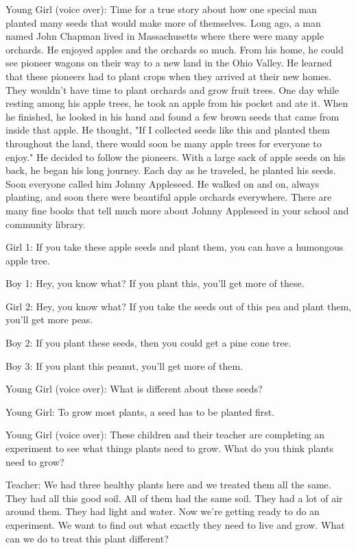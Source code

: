Young Girl (voice over): Time for a true story about how one special man planted many seeds that would make more of themselves. Long ago, a man named John Chapman lived in Massachusetts where there were many apple orchards. He enjoyed apples and the orchards so much. From his home, he could see pioneer wagons on their way to a new land in the Ohio Valley. He learned that these pioneers had to plant crops when they arrived at their new homes. They wouldn't have time to plant orchards and grow fruit trees. One day while resting among his apple trees, he took an apple from his pocket and ate it. When he finished, he looked in his hand and found a few brown seeds that came from inside that apple. He thought, "If I collected seeds like this and planted them throughout the land, there would soon be many apple trees for everyone to enjoy." He decided to follow the pioneers. With a large sack of apple seeds on his back, he began his long journey. Each day as he traveled, he planted his seeds. Soon everyone called him Johnny Appleseed. He walked on and on, always planting, and soon there were beautiful apple orchards everywhere. There are many fine books that tell much more about Johnny Appleseed in your school and community library.

Girl 1: If you take these apple seeds and plant them, you can have a humongous apple tree.

Boy 1: Hey, you know what? If you plant this, you'll get more of these.

Girl 2: Hey, you know what? If you take the seeds out of this pea and plant them, you'll get more peas.

Boy 2: If you plant these seeds, then you could get a pine cone tree.

Boy 3: If you plant this peanut, you'll get more of them.

Young Girl (voice over): What is different about these seeds?

Young Girl: To grow most plants, a seed has to be planted first.

Young Girl (voice over): These children and their teacher are completing an experiment to see what things plants need to grow. What do you think plants need to grow?

Teacher: We had three healthy plants here and we treated them all the same. They had all this good soil. All of them had the same soil. They had a lot of air around them. They had light and water. Now we're getting ready to do an experiment. We want to find out what exactly they need to live and grow. What can we do to treat this plant different?

